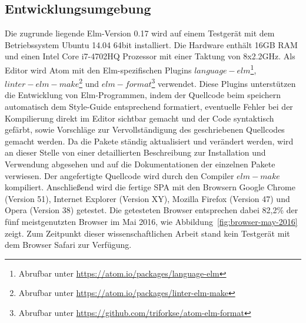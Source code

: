 \subsection{Entwicklungsumgebung}
\label{sec:Entwicklungsumgebung}
Die zugrunde liegende Elm-Version 0.17 wird auf einem Testgerät mit dem Betriebssystem Ubuntu 14.04 64bit installiert. Die Hardware enthält 16GB RAM und einen Intel Core i7-4702HQ Prozessor mit einer Taktung von 8x2.2GHz. Als Editor wird Atom mit den Elm-spezifischen Plugins $language-elm$\footnote{Abrufbar unter \url{https://atom.io/packages/language-elm}}, $linter-elm-make$\footnote{Abrufbar unter \url{https://atom.io/packages/linter-elm-make}} und $elm-format$\footnote{Abrufbar unter \url{https://github.com/triforkse/atom-elm-format}} verwendet. Diese Plugins unterstützen die Entwicklung von Elm-Programmen, indem der Quellcode beim speichern automatisch dem Style-Guide entsprechend formatiert, eventuelle Fehler bei der Kompilierung direkt im Editor sichtbar gemacht und der Code syntaktisch gefärbt, sowie Vorschläge zur Vervollständigung des geschriebenen Quellcodes gemacht werden. Da die Pakete ständig aktualisiert und verändert werden, wird an dieser Stelle von einer detaillierten Beschreibung zur Installation und Verwendung abgesehen und auf die Dokumentationen der einzelnen Pakete verwiesen.
Der angefertigte Quellcode wird durch den Compiler $elm-make$ kompiliert.
Anschließend wird die fertige \ac{SPA} mit den Browsern Google Chrome (Version 51), Internet Explorer (Version XY), Mozilla Firefox (Version 47) und Opera (Version 38) getestet. Die getesteten Browser entsprechen dabei 82,2\% der fünf meistgenutzten Browser im Mai 2016, wie Abbildung~\ref{fig:browser-may-2016} zeigt. Zum Zeitpunkt dieser wissenschaftlichen Arbeit stand kein Testgerät mit dem Browser Safari zur Verfügung.

